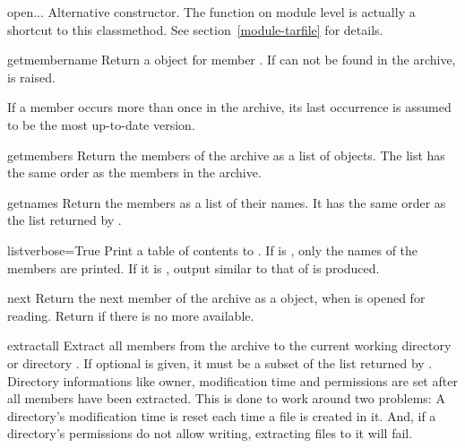 \begin{methoddesc}{open}{...}
    Alternative constructor. The  function on module level is
    actually a shortcut to this classmethod. See section~\ref{module-tarfile}
    for details.
\end{methoddesc}

\begin{methoddesc}{getmember}{name}
    Return a  object for member . If  can
    not be found in the archive,  is raised.
    \begin{notice}
        If a member occurs more than once in the archive, its last
        occurrence is assumed to be the most up-to-date version.
    \end{notice}
\end{methoddesc}

\begin{methoddesc}{getmembers}{}
    Return the members of the archive as a list of  objects.
    The list has the same order as the members in the archive.
\end{methoddesc}

\begin{methoddesc}{getnames}{}
    Return the members as a list of their names. It has the same order as
    the list returned by .
\end{methoddesc}

\begin{methoddesc}{list}{verbose=True}
    Print a table of contents to . If  is
    , only the names of the members are printed. If it is
    , output similar to that of  is produced.
\end{methoddesc}

\begin{methoddesc}{next}{}
    Return the next member of the archive as a  object, when
     is opened for reading. Return  if there is no
    more available.
\end{methoddesc}

\begin{methoddesc}{extractall}{}
    Extract all members from the archive to the current working directory
    or directory . If optional  is given, it must be
    a subset of the list returned by .
    Directory informations like owner, modification time and permissions are
    set after all members have been extracted. This is done to work around two
    problems: A directory's modification time is reset each time a file is
    created in it. And, if a directory's permissions do not allow writing,
    extracting files to it will fail.
\end{methoddesc}

